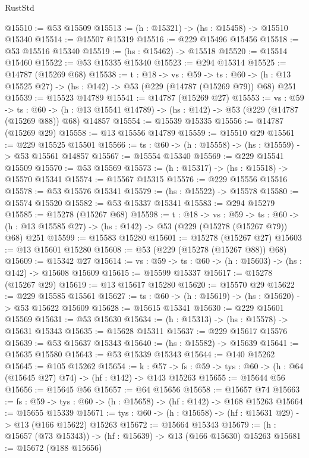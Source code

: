 \begin{lexlean}{RustStd}
\begin{coremodule}
@15510 := @53 @15509
@15513 := (h : @15321) -> (hs : @15458) -> @15510 @15340
@15514 := @15507 @15319
@15516 := @229 @15496 @15456
@15518 := @53 @15516 @15340
@15519 := (hs : @15462) -> @15518
@15520 := @15514 @15460
@15522 := @53 @15335 @15340
@15523 := @294 @15314
@15525 := @14787 (@15269 @68)
@15538 := {t : @18} ->
  {vs : @59} ->
  {ts : @60} -> (h : @13 @15525 @27) -> (hs : @142) -> @53 (@229 (@14787 (@15269 @79)) @68) @251
@15539 := @15523 @14789
@15541 := @14787 (@15269 @27)
@15553 := {vs : @59} ->
  {ts : @60} ->
  (h : @13 @15541 @14789) -> (hs : @142) -> @53 (@229 (@14787 (@15269 @88)) @68) @14857
@15554 := @15539 @15335
@15556 := @14787 (@15269 @29)
@15558 := @13 @15556 @14789
@15559 := @15510 @29
@15561 := @229 @15525 @15501
@15566 := {ts : @60} -> (h : @15558) -> (hs : @15559) -> @53 @15561 @14857
@15567 := @15554 @15340
@15569 := @229 @15541 @15509
@15570 := @53 @15569
@15573 := (h : @15317) -> (hs : @15518) -> @15570 @15341
@15574 := @15567 @15315
@15576 := @229 @15556 @15516
@15578 := @53 @15576 @15341
@15579 := (hs : @15522) -> @15578
@15580 := @15574 @15520
@15582 := @53 @15337 @15341
@15583 := @294 @15279
@15585 := @15278 (@15267 @68)
@15598 := {t : @18} ->
  {vs : @59} ->
  {ts : @60} -> (h : @13 @15585 @27) -> (hs : @142) -> @53 (@229 (@15278 (@15267 @79)) @68) @251
@15599 := @15583 @15280
@15601 := @15278 (@15267 @27)
@15603 := @13 @15601 @15280
@15608 := @53 (@229 (@15278 (@15267 @88)) @68)
@15609 := @15342 @27
@15614 := {vs : @59} -> {ts : @60} -> (h : @15603) -> (hs : @142) -> @15608 @15609
@15615 := @15599 @15337
@15617 := @15278 (@15267 @29)
@15619 := @13 @15617 @15280
@15620 := @15570 @29
@15622 := @229 @15585 @15561
@15627 := {ts : @60} -> (h : @15619) -> (hs : @15620) -> @53 @15622 @15609
@15628 := @15615 @15341
@15630 := @229 @15601 @15569
@15631 := @53 @15630
@15634 := (h : @15313) -> (hs : @15578) -> @15631 @15343
@15635 := @15628 @15311
@15637 := @229 @15617 @15576
@15639 := @53 @15637 @15343
@15640 := (hs : @15582) -> @15639
@15641 := @15635 @15580
@15643 := @53 @15339 @15343
@15644 := @140 @15262
@15645 := @105 @15262
@15654 := {k : @57} ->
  {fs : @59} -> {tys : @60} -> (h : @64 (@15645 @27) @74) -> (hf : @142) -> @143 @15263
@15655 := @15644 @56
@15656 := @15645 @56
@15657 := @64 @15656
@15658 := @15657 @74
@15663 := {fs : @59} -> {tys : @60} -> (h : @15658) -> (hf : @142) -> @168 @15263
@15664 := @15655 @15339
@15671 := {tys : @60} -> (h : @15658) -> (hf : @15631 @29) -> @13 (@166 @15622) @15263
@15672 := @15664 @15343
@15679 := (h : @15657 (@73 @15343)) -> (hf : @15639) -> @13 (@166 @15630) @15263
@15681 := @15672 (@188 @15656)

\end{coremodule}
\end{lexlean}
